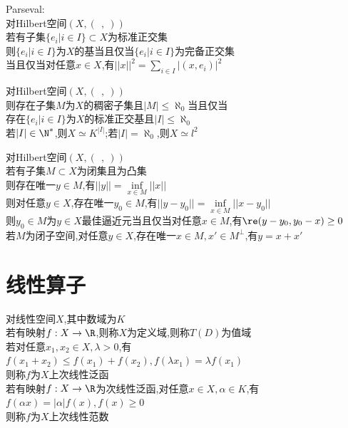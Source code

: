 \begin{dingli}
Parseval:\\
对Hilbert空间$(X,(\ \ ,\ ))$\\
若有子集$\{e_i|i\in I\}\subset X$为标准正交集\\
则$\{e_i|i\in I\}$为$X$的基当且仅当$\{e_i|i\in I\}$为完备正交集\\
当且仅当对任意$x\in X$,有$||x||^2=\sum\limits_{i\in I}|(x,e_i)|^2$
\end{dingli}

\begin{dingli}
对Hilbert空间$(X,(\ \ ,\ ))$\\
则存在子集$M$为$X$的稠密子集且$|M|\leq \aleph_0$当且仅当\\
存在$\{e_i|i\in I\}$为$X$的标准正交基且$|I|\leq \aleph_0$\\
若$|I|\in\N^*$,则$X\simeq K^{|I|}$;若$|I|=\aleph_0$,则$X\simeq l^2$
\end{dingli}

\begin{dingli}
对Hilbert空间$(X,(\ \ ,\ ))$\\
若有子集$M\subset X$为闭集且为凸集\\
则存在唯一$y\in M$,有$||y||=\inf\limits_{x\in M}||x||$\\
则对任意$y\in X$,存在唯一$y_0\in M$,有$||y-y_0||=\inf\limits_{x\in M}||x-y_0||$\\
则$y_0\in M$为$y\in X$最佳逼近元当且仅当对任意$x\in M$,有$\re(y-y_0,y_0-x)\geq 0$\\
若$M$为闭子空间,对任意$y\in X$,存在唯一$x\in M,x'\in M^{\bot}$,有$y=x+x'$
\end{dingli}

\chapter{线性算子}

\begin{dingyi}
对线性空间$X$,其中数域为$K$\\
若有映射$f:X\to \R$,则称$X$为定义域,则称$T(D)$为值域\\
若对任意$x_1,x_2\in X,\lambda>0$,有$f(x_1+x_2)\leq f(x_1)+f(x_2), f(\lambda x_1)=\lambda f(x_1)$\\
则称$f$为$X$上次线性泛函\\
若有映射$f:X\to \R$为次线性泛函,对任意$x\in X,\alpha\in K$,有$f(\alpha x)=|\alpha|f(x),f(x)\geq 0$\\
则称$f$为$X$上次线性范数
\end{dingyi}

